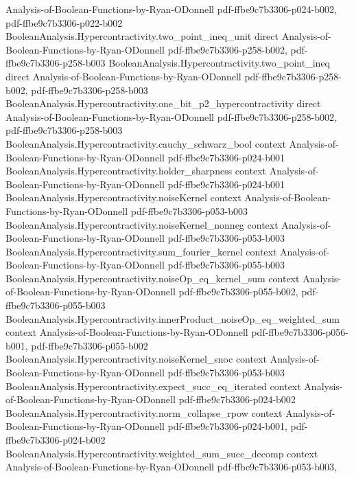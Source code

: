 \begin{theorem}
  {Analysis-of-Boolean-Functions-by-Ryan-ODonnell}
  {pdf-ffbe9c7b3306-p024-b002,
    pdf-ffbe9c7b3306-p022-b002}
\proofstep
  {BooleanAnalysis.Hypercontractivity.two_point_ineq_unit}
  {direct}
  {Analysis-of-Boolean-Functions-by-Ryan-ODonnell}
  {pdf-ffbe9c7b3306-p258-b002,
    pdf-ffbe9c7b3306-p258-b003}
\proofstep
  {BooleanAnalysis.Hypercontractivity.two_point_ineq}
  {direct}
  {Analysis-of-Boolean-Functions-by-Ryan-ODonnell}
  {pdf-ffbe9c7b3306-p258-b002,
    pdf-ffbe9c7b3306-p258-b003}
\proofstep
  {BooleanAnalysis.Hypercontractivity.one_bit_p2_hypercontractivity}
  {direct}
  {Analysis-of-Boolean-Functions-by-Ryan-ODonnell}
  {pdf-ffbe9c7b3306-p258-b002,
    pdf-ffbe9c7b3306-p258-b003}
\proofstep
  {BooleanAnalysis.Hypercontractivity.cauchy_schwarz_bool}
  {context}
  {Analysis-of-Boolean-Functions-by-Ryan-ODonnell}
  {pdf-ffbe9c7b3306-p024-b001}
\proofstep
  {BooleanAnalysis.Hypercontractivity.holder_sharpness}
  {context}
  {Analysis-of-Boolean-Functions-by-Ryan-ODonnell}
  {pdf-ffbe9c7b3306-p024-b001}
\proofstep
  {BooleanAnalysis.Hypercontractivity.noiseKernel}
  {context}
  {Analysis-of-Boolean-Functions-by-Ryan-ODonnell}
  {pdf-ffbe9c7b3306-p053-b003}
\proofstep
  {BooleanAnalysis.Hypercontractivity.noiseKernel_nonneg}
  {context}
  {Analysis-of-Boolean-Functions-by-Ryan-ODonnell}
  {pdf-ffbe9c7b3306-p053-b003}
\proofstep
  {BooleanAnalysis.Hypercontractivity.sum_fourier_kernel}
  {context}
  {Analysis-of-Boolean-Functions-by-Ryan-ODonnell}
  {pdf-ffbe9c7b3306-p055-b003}
\proofstep
  {BooleanAnalysis.Hypercontractivity.noiseOp_eq_kernel_sum}
  {context}
  {Analysis-of-Boolean-Functions-by-Ryan-ODonnell}
  {pdf-ffbe9c7b3306-p055-b002,
    pdf-ffbe9c7b3306-p055-b003}
\proofstep
  {BooleanAnalysis.Hypercontractivity.innerProduct_noiseOp_eq_weighted_sum}
  {context}
  {Analysis-of-Boolean-Functions-by-Ryan-ODonnell}
  {pdf-ffbe9c7b3306-p056-b001,
    pdf-ffbe9c7b3306-p055-b002}
\proofstep
  {BooleanAnalysis.Hypercontractivity.noiseKernel_snoc}
  {context}
  {Analysis-of-Boolean-Functions-by-Ryan-ODonnell}
  {pdf-ffbe9c7b3306-p053-b003}
\proofstep
  {BooleanAnalysis.Hypercontractivity.expect_succ_eq_iterated}
  {context}
  {Analysis-of-Boolean-Functions-by-Ryan-ODonnell}
  {pdf-ffbe9c7b3306-p024-b002}
\proofstep
  {BooleanAnalysis.Hypercontractivity.norm_collapse_rpow}
  {context}
  {Analysis-of-Boolean-Functions-by-Ryan-ODonnell}
  {pdf-ffbe9c7b3306-p024-b001,
    pdf-ffbe9c7b3306-p024-b002}
\proofstep
  {BooleanAnalysis.Hypercontractivity.weighted_sum_succ_decomp}
  {context}
  {Analysis-of-Boolean-Functions-by-Ryan-ODonnell}
  {pdf-ffbe9c7b3306-p053-b003,
}
\end{theorem}
